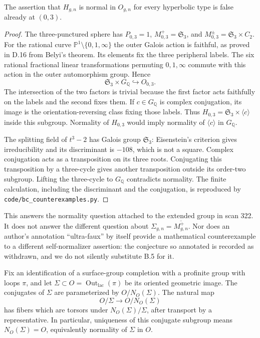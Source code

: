 The assertion that $H_{g,n}$ is normal in $O_{g,n}$ for every
hyperbolic type is false already at $(0,3)$.

\begin{proof}
The three-punctured sphere has
$P_{0,3}=1$, $M^+_{0,3}=\mathfrak S_3$, and
$M^{\pm}_{0,3}=\mathfrak S_3\times C_2$.
For the rational curve
$\mathbb P^1\setminus\{0,1,\infty\}$ the outer Galois action is
faithful, as proved in D.16 from Belyi's theorem.  Its elements fix
the three peripheral labels.  The six rational fractional linear
transformations permuting $0,1,\infty$ commute with this action in the
outer automorphism group.  Hence
\[
 \mathfrak S_3\times G_{\mathbb Q}\hookrightarrow O_{0,3}.
\]
The intersection of the two factors is trivial because the first
factor acts faithfully on the labels and the second fixes them.
If $c\in G_{\mathbb Q}$ is complex conjugation, its image is the
orientation-reversing class fixing those labels.  Thus
$H_{0,3}=\mathfrak S_3\times\langle c\rangle$ inside this subgroup.
Normality of $H_{0,3}$ would imply normality of
$\langle c\rangle$ in $G_{\mathbb Q}$.

The splitting field of $t^3-2$ has Galois group $\mathfrak S_3$:
Eisenstein's criterion gives irreducibility and its discriminant is
$-108$, which is not a square.  Complex conjugation acts as a
transposition on its three roots.  Conjugating this transposition by
a three-cycle gives another transposition outside its order-two
subgroup.  Lifting the three-cycle to $G_{\mathbb Q}$ contradicts
normality.  The finite calculation, including the discriminant and
the conjugation, is reproduced by \texttt{code/bc\_counterexamples.py}.
\end{proof}

This answers the normality question attached to the extended group in
scan 322.  It does not answer the different question about
$\Sigma_{g,n}=\overline{M^+_{g,n}}$.  Nor does an author's annotation
``ultra-faux'' by itself provide a mathematical counterexample to a
different self-normalizer assertion: the conjecture so annotated is
recorded as withdrawn, and we do not silently substitute B.5 for it.

Fix an identification of a surface-group completion with a profinite
group with loops $\pi$, and let $\Sigma\subset O=\operatorname{Out}_{\mathrm{lac}}(\pi)$
be its oriented geometric image.  The conjugates of $\Sigma$ are
parameterized by $O/N_O(\Sigma)$.  The natural map
\[
 O/\Sigma\longrightarrow O/N_O(\Sigma)
\]
has fibers which are torsors under $N_O(\Sigma)/\Sigma$, after
transport by a representative.  In particular, uniqueness of this
conjugate subgroup means $N_O(\Sigma)=O$, equivalently normality of
$\Sigma$ in $O$.

